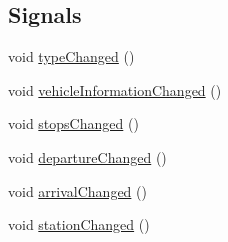\subsection*{Signals}
\begin{DoxyCompactItemize}
\item 
void \mbox{\hyperlink{classQRail_1_1RouterEngine_1_1RouteLeg_ad887cc06d380eac963714e03b8ea5f64}{type\+Changed}} ()
\item 
void \mbox{\hyperlink{classQRail_1_1RouterEngine_1_1RouteLeg_af30e3314b500b47610b15d5b737e550e}{vehicle\+Information\+Changed}} ()
\item 
void \mbox{\hyperlink{classQRail_1_1RouterEngine_1_1RouteLeg_a40b43dae43531bc327d2622db6fe1866}{stops\+Changed}} ()
\item 
void \mbox{\hyperlink{classQRail_1_1RouterEngine_1_1RouteLeg_a861babbdb442de62d07e99b8b716f2e6}{departure\+Changed}} ()
\item 
void \mbox{\hyperlink{classQRail_1_1RouterEngine_1_1RouteLeg_a6364bb0f1f809f1e354d5a97d72dfee8}{arrival\+Changed}} ()
\item 
void \mbox{\hyperlink{classQRail_1_1RouterEngine_1_1RouteLeg_ad277aa8520cffb7bd4a89ce9ec948663}{station\+Changed}} ()
\end{DoxyCompactItemize}
